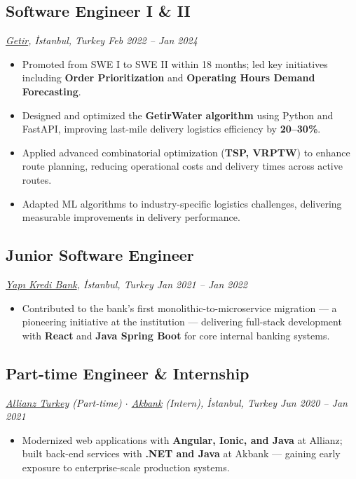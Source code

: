 \documentclass[a4paper,10pt]{article}
\begin{document}
\subsection{Software Engineer I \& II}
\textit{\href{https://getir.com}{Getir}, İstanbul, Turkey \hfill Feb 2022 -- Jan 2024}
\begin{itemize}[label=--,leftmargin=*]
    \item Promoted from SWE I to SWE II within 18 months; led key initiatives including \textbf{Order Prioritization} and \textbf{Operating Hours Demand Forecasting}.
    \item Designed and optimized the \textbf{GetirWater algorithm} using Python and FastAPI, improving last-mile delivery logistics efficiency by \textbf{20--30\%}.
    \item Applied advanced combinatorial optimization (\textbf{TSP, VRPTW}) to enhance route planning, reducing operational costs and delivery times across active routes.
    \item Adapted ML algorithms to industry-specific logistics challenges, delivering measurable improvements in delivery performance.
\end{itemize}

\subsection{Junior Software Engineer}
\textit{\href{https://www.yapikredi.com.tr}{Yapı Kredi Bank}, İstanbul, Turkey \hfill Jan 2021 -- Jan 2022}
\begin{itemize}[label=--,leftmargin=*]
    \item Contributed to the bank's first monolithic-to-microservice migration --- a pioneering initiative at the institution --- delivering full-stack development with \textbf{React} and \textbf{Java Spring Boot} for core internal banking systems.
\end{itemize}

\subsection{Part-time Engineer \& Internship}
\textit{\href{https://www.allianz.com.tr}{Allianz Turkey} (Part-time) $\cdot$ \href{https://www.akbank.com}{Akbank} (Intern), İstanbul, Turkey \hfill Jun 2020 -- Jan 2021}
\begin{itemize}[label=--,leftmargin=*]
    \item Modernized web applications with \textbf{Angular, Ionic, and Java} at Allianz; built back-end services with \textbf{.NET and Java} at Akbank --- gaining early exposure to enterprise-scale production systems.
\end{itemize}
\end{document}
